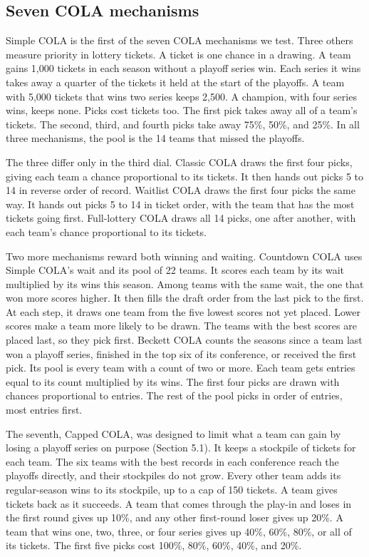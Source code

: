 \documentclass[11pt,letterpaper]{article}
\begin{document}
\subsection{Seven COLA mechanisms}

Simple COLA is the first of the seven COLA mechanisms we test. Three others measure priority in lottery tickets. A ticket is one chance in a drawing. A team gains 1,000 tickets in each season without a playoff series win. Each series it wins takes away a quarter of the tickets it held at the start of the playoffs. A team with 5,000 tickets that wins two series keeps 2,500. A champion, with four series wins, keeps none. Picks cost tickets too. The first pick takes away all of a team's tickets. The second, third, and fourth picks take away 75\%, 50\%, and 25\%. In all three mechanisms, the pool is the 14 teams that missed the playoffs.

The three differ only in the third dial. Classic COLA draws the first four picks, giving each team a chance proportional to its tickets. It then hands out picks 5 to 14 in reverse order of record. Waitlist COLA draws the first four picks the same way. It hands out picks 5 to 14 in ticket order, with the team that has the most tickets going first. Full-lottery COLA draws all 14 picks, one after another, with each team's chance proportional to its tickets.

Two more mechanisms reward both winning and waiting. Countdown COLA uses Simple COLA's wait and its pool of 22 teams. It scores each team by its wait multiplied by its wins this season. Among teams with the same wait, the one that won more scores higher. It then fills the draft order from the last pick to the first. At each step, it draws one team from the five lowest scores not yet placed. Lower scores make a team more likely to be drawn. The teams with the best scores are placed last, so they pick first. Beckett COLA counts the seasons since a team last won a playoff series, finished in the top six of its conference, or received the first pick. Its pool is every team with a count of two or more. Each team gets entries equal to its count multiplied by its wins. The first four picks are drawn with chances proportional to entries. The rest of the pool picks in order of entries, most entries first.

The seventh, Capped COLA, was designed to limit what a team can gain by losing a playoff series on purpose (Section 5.1). It keeps a stockpile of tickets for each team. The six teams with the best records in each conference reach the playoffs directly, and their stockpiles do not grow. Every other team adds its regular-season wins to its stockpile, up to a cap of 150 tickets. A team gives tickets back as it succeeds. A team that comes through the play-in and loses in the first round gives up 10\%, and any other first-round loser gives up 20\%. A team that wins one, two, three, or four series gives up 40\%, 60\%, 80\%, or all of its tickets. The first five picks cost 100\%, 80\%, 60\%, 40\%, and 20\%.
\end{document}

